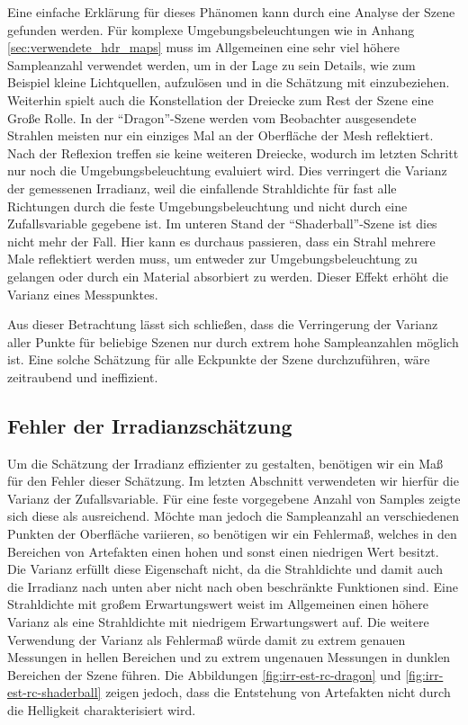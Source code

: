 		Eine einfache Erklärung für dieses Phänomen kann durch eine Analyse der Szene gefunden werden.
		Für komplexe Umgebungsbeleuchtungen wie in Anhang \ref{sec:verwendete_hdr_maps} muss im Allgemeinen eine sehr viel höhere Sampleanzahl verwendet werden, um in der Lage zu sein Details, wie zum Beispiel kleine Lichtquellen, aufzulösen und in die Schätzung mit einzubeziehen.
		Weiterhin spielt auch die Konstellation der Dreiecke zum Rest der Szene eine Große Rolle.
		In der \enquote{Dragon}-Szene werden vom Beobachter ausgesendete Strahlen meisten nur ein einziges Mal an der Oberfläche der Mesh reflektiert.
		Nach der Reflexion treffen sie keine weiteren Dreiecke, wodurch im letzten Schritt nur noch die Umgebungsbeleuchtung evaluiert wird.
		Dies verringert die Varianz der gemessenen Irradianz, weil die einfallende Strahldichte für fast alle Richtungen durch die feste Umgebungsbeleuchtung und nicht durch eine Zufallsvariable gegebene ist.
		Im unteren Stand der \enquote{Shaderball}-Szene ist dies nicht mehr der Fall.
		Hier kann es durchaus passieren, dass ein Strahl mehrere Male reflektiert werden muss, um entweder zur Umgebungsbeleuchtung zu gelangen oder durch ein Material absorbiert zu werden.
		Dieser Effekt erhöht die Varianz eines Messpunktes.

		Aus dieser Betrachtung lässt sich schließen, dass die Verringerung der Varianz aller Punkte für beliebige Szenen nur durch extrem hohe Sampleanzahlen möglich ist.
		Eine solche Schätzung für alle Eckpunkte der Szene durchzuführen, wäre zeitraubend und ineffizient.


	\subsection{Fehler der Irradianzschätzung} %
	\label{sub:fehler_der_irradianzschaetzung}

		Um die Schätzung der Irradianz effizienter zu gestalten, benötigen wir ein Maß für den Fehler dieser Schätzung.
		Im letzten Abschnitt verwendeten wir hierfür die Varianz der Zufallsvariable.
		Für eine feste vorgegebene Anzahl von Samples zeigte sich diese als ausreichend.
		Möchte man jedoch die Sampleanzahl an verschiedenen Punkten der Oberfläche variieren, so benötigen wir ein Fehlermaß, welches in den Bereichen von Artefakten einen hohen und sonst einen niedrigen Wert besitzt.
		Die Varianz erfüllt diese Eigenschaft nicht, da die Strahldichte und damit auch die Irradianz nach unten aber nicht nach oben beschränkte Funktionen sind.
		Eine Strahldichte mit großem Erwartungswert weist im Allgemeinen einen höhere Varianz als eine Strahldichte mit niedrigem Erwartungswert auf.
		Die weitere Verwendung der Varianz als Fehlermaß würde damit zu extrem genauen Messungen in hellen Bereichen und zu extrem ungenauen Messungen in dunklen Bereichen der Szene führen.
		Die Abbildungen \ref{fig:irr-est-rc-dragon} und \ref{fig:irr-est-rc-shaderball} zeigen jedoch, dass die Entstehung von Artefakten nicht durch die Helligkeit charakterisiert wird.


